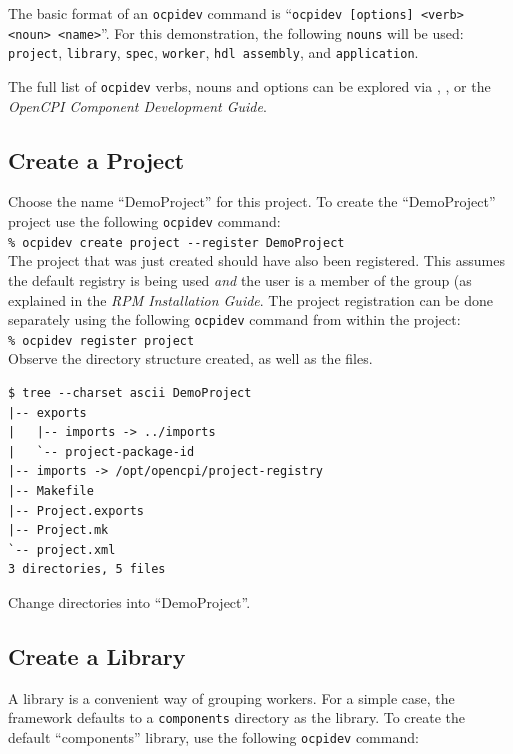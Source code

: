 The basic format of an \verb+ocpidev+ command is ``\verb+ocpidev [options] <verb> <noun> <name>+''. For this demonstration, the following \verb+nouns+ will be used: \verb+project+, \verb+library+, \verb+spec+, \verb+worker+, \verb+hdl assembly+, and \verb+application+.\newline

The full list of \verb+ocpidev+ verbs, nouns and options can be explored via , , or the \textit{OpenCPI Component Development Guide}.

\subsection{Create a Project}
Choose the name ``DemoProject'' for this project. To create the ``DemoProject'' project use the following \verb+ocpidev+ command:\\

\forceindent\verb+% ocpidev create project --register DemoProject+\\

The project that was just created should have also been registered. This assumes the default registry is being used \textit{and} the user is a member of the  group (as explained in the \textit{RPM Installation Guide}. The project registration can be done separately using the following \verb+ocpidev+ command from within the project:\\

\forceindent\forceindent\verb+% ocpidev register project+\\

Observe the directory structure created, as well as the files.\\

\bstart
\begin{verbatim}
$ tree --charset ascii DemoProject
|-- exports
|   |-- imports -> ../imports
|   `-- project-package-id
|-- imports -> /opt/opencpi/project-registry
|-- Makefile
|-- Project.exports
|-- Project.mk
`-- project.xml
3 directories, 5 files
\end{verbatim}
\bend
Change directories into ``DemoProject''.

\subsection{Create a Library}
A library is a convenient way of grouping workers. For a simple case, the framework defaults to a \verb+components+ directory as the library. To create the default ``components'' library, use the following \verb+ocpidev+ command:\\

